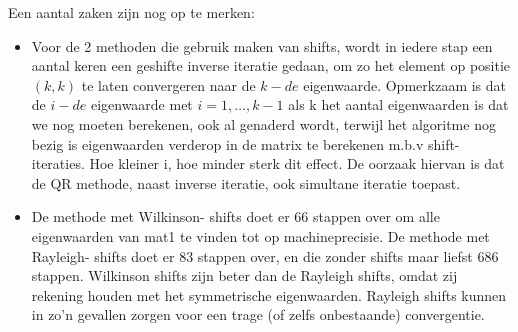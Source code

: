 \documentclass[]{article}
\begin{document}
Een aantal zaken zijn nog op te merken:
\begin{itemize}
	\item Voor de 2 methoden die gebruik maken van shifts, wordt in iedere stap een aantal keren een geshifte inverse iteratie gedaan, om zo het element op positie $(k,k)$ te laten convergeren naar de $k-de$ eigenwaarde. Opmerkzaam is dat de $i-de$ eigenwaarde met $i = 1,\dots,k-1$ als k het aantal eigenwaarden is dat we nog moeten berekenen, ook al genaderd wordt, terwijl het algoritme nog bezig is eigenwaarden verderop in de matrix te berekenen m.b.v shift- iteraties. Hoe kleiner i, hoe minder sterk dit effect. De oorzaak hiervan is dat de QR methode, naast inverse iteratie, ook simultane iteratie toepast.
	\item De methode met Wilkinson- shifts doet er 66 stappen over om alle eigenwaarden van mat1 te vinden tot op machineprecisie. De methode met Rayleigh- shifts doet er 83 stappen over, en die zonder shifts maar liefst 686 stappen. Wilkinson shifts zijn beter dan de Rayleigh shifts, omdat zij rekening houden met het symmetrische eigenwaarden. Rayleigh shifts kunnen in zo'n gevallen zorgen voor een trage (of zelfs onbestaande) convergentie.
\end{itemize}
\end{document}
